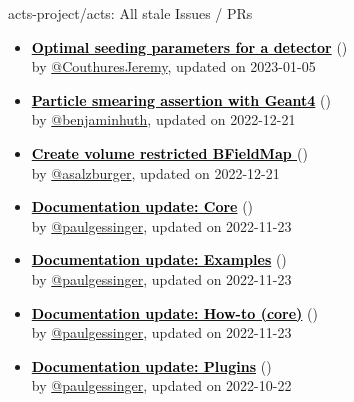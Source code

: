 \begin{frame}[allowframebreaks]{ acts-project/acts: All stale Issues / PRs}
\begin{itemize}
    \item\iss\prstale\textbf{\href{https://github.com/acts-project/acts/issues/1699}{\textcolor{black}{Optimal seeding parameters for a detector}}}
    (\href{https://github.com/acts-project/acts/issues/1699}{}) \\
    by \href{https://github.com/CouthuresJeremy}{@CouthuresJeremy}, updated on 2023-01-05

    \item\iss\prstale\textbf{\href{https://github.com/acts-project/acts/issues/1603}{\textcolor{black}{Particle smearing assertion with Geant4}}}
    (\href{https://github.com/acts-project/acts/issues/1603}{}) \\
    by \href{https://github.com/benjaminhuth}{@benjaminhuth}, updated on 2022-12-21

    \item\iss\prstale\textbf{\href{https://github.com/acts-project/acts/issues/1659}{\textcolor{black}{Create volume restricted BFieldMap }}}
    (\href{https://github.com/acts-project/acts/issues/1659}{}) \\
    by \href{https://github.com/asalzburger}{@asalzburger}, updated on 2022-12-21

    \item\iss\prstale\textbf{\href{https://github.com/acts-project/acts/issues/1418}{\textcolor{black}{Documentation update: Core}}}
    (\href{https://github.com/acts-project/acts/issues/1418}{}) \\
    by \href{https://github.com/paulgessinger}{@paulgessinger}, updated on 2022-11-23

    \item\iss\prstale\textbf{\href{https://github.com/acts-project/acts/issues/1420}{\textcolor{black}{Documentation update: Examples}}}
    (\href{https://github.com/acts-project/acts/issues/1420}{}) \\
    by \href{https://github.com/paulgessinger}{@paulgessinger}, updated on 2022-11-23

    \item\iss\prstale\textbf{\href{https://github.com/acts-project/acts/issues/1422}{\textcolor{black}{Documentation update: How-to (core)}}}
    (\href{https://github.com/acts-project/acts/issues/1422}{}) \\
    by \href{https://github.com/paulgessinger}{@paulgessinger}, updated on 2022-11-23

    \item\iss\prstale\textbf{\href{https://github.com/acts-project/acts/issues/1421}{\textcolor{black}{Documentation update: Plugins}}}
    (\href{https://github.com/acts-project/acts/issues/1421}{}) \\
    by \href{https://github.com/paulgessinger}{@paulgessinger}, updated on 2022-10-22


\end{itemize}
\end{frame}

